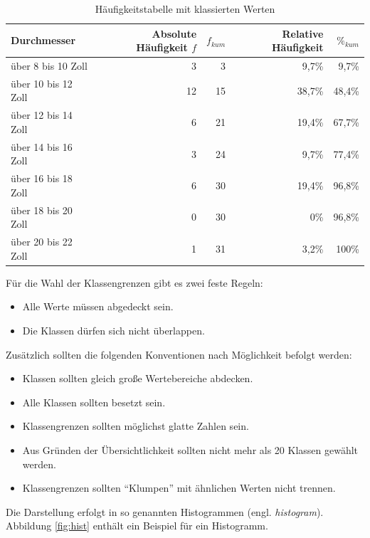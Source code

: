 \documentclass[
  11pt,
  ngerman,
  a4paper,
]{report}
\providecommand{\tightlist}{%
  \setlength{\itemsep}{0pt}\setlength{\parskip}{0pt}}
\begin{document}
\begin{table}

\caption{\label{tab:haeufklass}Häufigkeitstabelle mit klassierten Werten}
\centering
\begin{tabular}[t]{lrrrr}
\toprule
Durchmesser & Absolute Häufigkeit $f$ & $f_{kum}$ & Relative Häufigkeit & $\%_{kum}$\\
\midrule
über 8 bis 10 Zoll & 3 & 3 & 9,7\% & 9,7\%\\
über 10 bis 12 Zoll & 12 & 15 & 38,7\% & 48,4\%\\
über 12 bis 14 Zoll & 6 & 21 & 19,4\% & 67,7\%\\
über 14 bis 16 Zoll & 3 & 24 & 9,7\% & 77,4\%\\
über 16 bis 18 Zoll & 6 & 30 & 19,4\% & 96,8\%\\
über 18 bis 20 Zoll & 0 & 30 & 0\% & 96,8\%\\
über 20 bis 22 Zoll & 1 & 31 & 3,2\% & 100\%\\
\bottomrule
\end{tabular}
\end{table}

Für die Wahl der Klassengrenzen gibt es zwei feste Regeln:

\begin{itemize}
\tightlist
\item
  Alle Werte müssen abgedeckt sein.
\item
  Die Klassen dürfen sich nicht überlappen.
\end{itemize}

Zusätzlich sollten die folgenden Konventionen nach Möglichkeit befolgt werden:

\begin{itemize}
\tightlist
\item
  Klassen sollten gleich große Wertebereiche abdecken.
\item
  Alle Klassen sollten besetzt sein.
\item
  Klassengrenzen sollten möglichst glatte Zahlen sein.
\item
  Aus Gründen der Übersichtlichkeit sollten nicht mehr als 20 Klassen gewählt werden.
\item
  Klassengrenzen sollten \enquote{Klumpen} mit ähnlichen Werten nicht trennen.
\end{itemize}

Die Darstellung erfolgt in so genannten Histogrammen (engl. \emph{histogram}). Abbildung \ref{fig:hist} enthält ein Beispiel für ein Histogramm.
\end{document}
